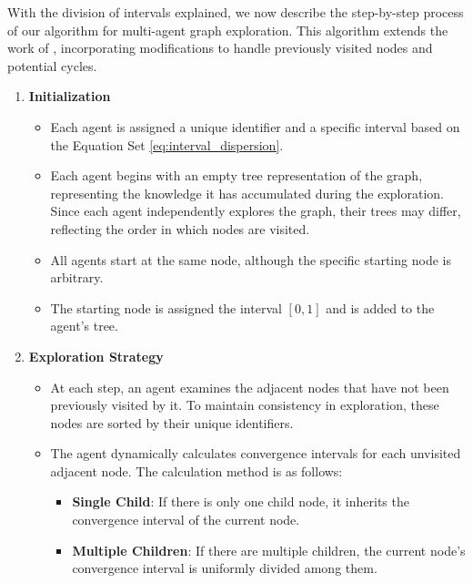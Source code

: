 With the division of intervals explained, we now describe the step-by-step process of our algorithm for
multi-agent graph exploration.
This algorithm extends the work of ,
incorporating modifications to handle previously visited nodes and potential cycles.

\begin{enumerate}
    \item \textbf{Initialization}
    \begin{itemize}
        \item Each agent is assigned a unique identifier and a specific interval based on the Equation Set \ref{eq:interval_dispersion}.
        \item Each agent begins with an empty tree representation of the graph, representing the knowledge it has accumulated during the exploration. Since each agent independently explores the graph, their trees may differ, reflecting the order in which nodes are visited.
        \item All agents start at the same node, although the specific starting node is arbitrary.
        \item The starting node is assigned the interval $[0,1]$ and is added to the agent's tree.
    \end{itemize}
    \item \textbf{Exploration Strategy}
    \begin{itemize}
        \item At each step, an agent examines the adjacent nodes that have not been previously visited by it. To maintain consistency in exploration, these nodes are sorted by their unique identifiers.
        \item The agent dynamically calculates convergence intervals for each unvisited adjacent node. The calculation method is as follows:
        \begin{itemize}

            \item \textbf{Single Child}: If there is only one child node, it inherits the convergence interval of the current node.
            
            \item \textbf{Multiple Children}: If there are multiple children, the current node's convergence interval is uniformly divided among them.
            

\end{itemize}
\end{itemize}
\end{enumerate}
